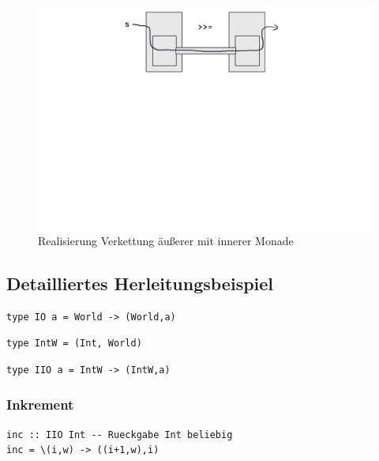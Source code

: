 		\begin{figure}[ht]
			\caption{Realisierung Verkettung äußerer mit innerer Monade}
			\includegraphics[width=\textwidth]{workfiles/v8_1}
		\end{figure}



	\newpage
	\subsection{Detailliertes Herleitungsbeispiel} %
	\label{sub:detailliertes_herleitungsbeispiel}
	
		\begin{lstlisting}
type IO a = World -> (World,a)
		\end{lstlisting}

		\begin{lstlisting}
type IntW = (Int, World)
		\end{lstlisting}

		\begin{lstlisting}
type IIO a = IntW -> (IntW,a)
		\end{lstlisting}

		\subsubsection{Inkrement} %
		\label{ssub:inkrement}
		
			\lstHaskell
			\begin{lstlisting}
inc :: IIO Int -- Rueckgabe Int beliebig
inc = \(i,w) -> ((i+1,w),i)
			\end{lstlisting}


